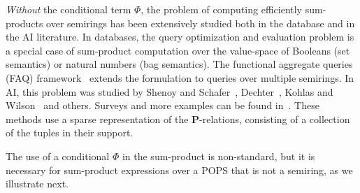 {\em Without} the conditional term $\Phi$,
the problem of computing efficiently sum-products over semirings has
been extensively studied both in the database and in the AI
literature. In databases, the query optimization and evaluation
problem is a special case of sum-product computation over the
value-space of Booleans (set semantics) or natural numbers (bag
semantics). The functional aggregate queries (FAQ)
framework~\cite{DBLP:conf/pods/KhamisNR16} extends the formulation to
queries over multiple semirings. In AI, this problem was studied by
Shenoy and Schafer~\cite{DBLP:conf/uai/ShenoyS88},
Dechter~\cite{DBLP:journals/constraints/Dechter97}, Kohlas and
Wilson~\cite{DBLP:journals/ai/KohlasW08} and others.  Surveys and more
examples can be found
in~\cite{DBLP:journals/tit/AjiM00,DBLP:books/daglib/0008195}.  These
methods use a sparse representation of the $\bm P$-relations,
consisting of a collection of the tuples in their support.

The use of a conditional $\Phi$ in the sum-product is non-standard,
but it is necessary for sum-product expressions over a POPS that is
not a semiring, as we illustrate next.

